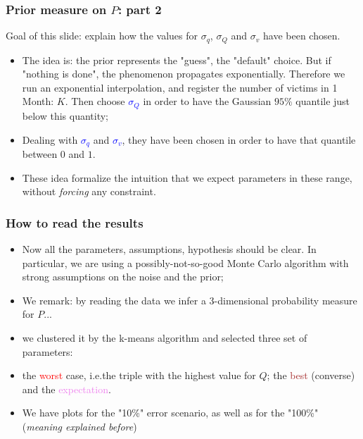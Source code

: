 \documentclass{beamer}
\begin{document}
\begin{frame}
	\frametitle{Prior measure on $P$: part 2}
	Goal of this slide: explain how the values for $\sigma_q$, $\sigma_Q$
	and $\sigma_v$ have been chosen.
	\begin{itemize}
		\item <1-> The idea is: the prior represents the "guess", the
			"default" choice. But if "nothing is done", the
			phenomenon propagates exponentially.
			Therefore we run an exponential interpolation,
			and register the number of victims
			in 1 Month: $K$. Then choose 
			\textcolor{blue}{$\sigma_Q$} in order
			to have the Gaussian $95\%$  quantile just 
			below this quantity;
		\item <2-> Dealing with 
			\textcolor{blue}{$\sigma_q$} and 
			\textcolor{blue}{$\sigma_v$}, they have 
			been chosen in order to have that quantile between
			$0$ and $1$.
		\item <3-> These idea formalize the intuition
			that we expect parameters in these range,
			without \emph{forcing} any constraint.
	\end{itemize}
\end{frame}

\begin{frame}
	\frametitle{How to read the results}
	\begin{itemize}
		\item<1-> Now all the parameters, assumptions, hypothesis
			should be clear. In particular,
			we are using a possibly-not-so-good
			Monte Carlo algorithm with strong assumptions
			on the noise and the prior;
		\item <2-> We remark: 
			by reading the data we infer a 3-dimensional
			probability measure for $P$...
		\item<3-> we clustered it by the k-means algorithm 
			and selected three set of parameters:
		\item <4-> the \textcolor{red}{worst} case, i.e.the triple
			with the highest
			value for $Q$; the \textcolor{brown}{best} 
			(converse) and the
			\textcolor{violet}{expectation}.
		\item <5-> We have plots for the "10\%" error scenario,
			as well as for the "100\%" (\emph{meaning
			explained before})
	\end{itemize}
\end{frame}
\end{document}

